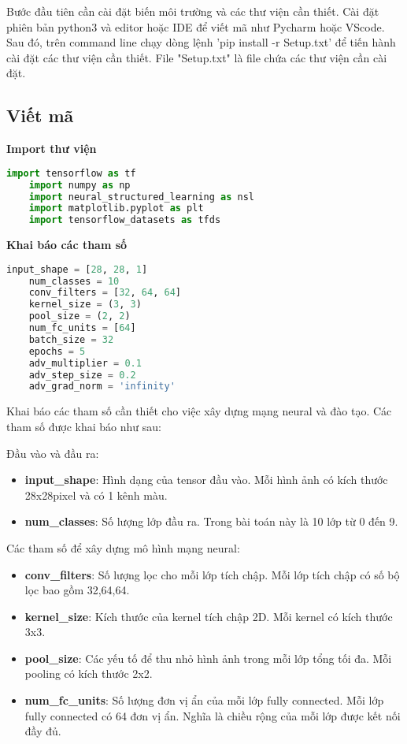 Bước đầu tiên cần cài đặt biến môi trường và các thư viện cần thiết. Cài đặt phiên bản python3 và editor hoặc IDE để viết mã như Pycharm hoặc VScode.
Sau đó, trên command line chạy dòng lệnh 'pip install -r Setup.txt' để tiến hành cài đặt các thư viện cần thiết. File "Setup.txt" là file chứa các thư viện 
cần cài đặt.

\subsection{Viết mã}
\textbf{Import thư viện}
\begin{lstlisting}[language=Python]
    import tensorflow as tf
    import numpy as np
    import neural_structured_learning as nsl
    import matplotlib.pyplot as plt
    import tensorflow_datasets as tfds
\end{lstlisting}

\textbf{Khai báo các tham số}
\begin{lstlisting}[language=Python]
    input_shape = [28, 28, 1]
    num_classes = 10
    conv_filters = [32, 64, 64]
    kernel_size = (3, 3)
    pool_size = (2, 2)
    num_fc_units = [64]
    batch_size = 32
    epochs = 5
    adv_multiplier = 0.1
    adv_step_size = 0.2
    adv_grad_norm = 'infinity'
\end{lstlisting}

Khai báo các tham số cần thiết cho việc xây dựng mạng neural và đào tạo. Các tham số được khai báo như sau:

Đầu vào và đầu ra:
\begin{itemize}
    \item \textbf{input\_shape}: Hình dạng của tensor đầu vào. Mỗi hình ảnh có kích thước 28x28pixel và có 1 kênh màu.
    \item \textbf{num\_classes}: Số lượng lớp đầu ra. Trong bài toán này là 10 lớp từ 0 đến 9.
\end{itemize}

Các tham số để xây dựng mô hình mạng neural:
\begin{itemize}
    \item \textbf{conv\_filters}: Số lượng lọc cho mỗi lớp tích chập. Mỗi lớp tích chập có số bộ lọc bao gồm 32,64,64.
    \item \textbf{kernel\_size}: Kích thước của kernel tích chập 2D. Mỗi kernel có kích thước 3x3.
    \item \textbf{pool\_size}: Các yếu tố để thu nhỏ hình ảnh trong mỗi lớp tổng tối đa. Mỗi pooling có kích thước 2x2.
    \item \textbf{num\_fc\_units}: Số lượng đơn vị ẩn của mỗi lớp fully connected. Mỗi lớp fully connected có 64 đơn vị ẩn. Nghĩa là chiều rộng của mỗi lớp được kết nối đầy đủ.
\end{itemize}

